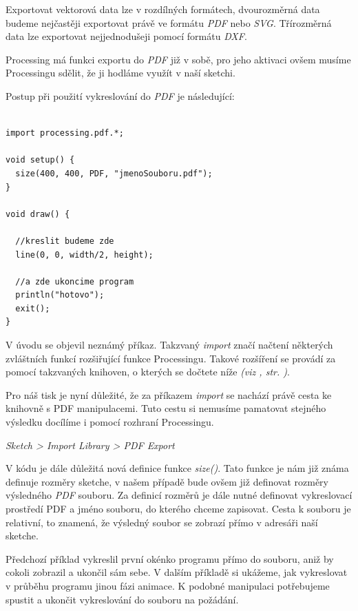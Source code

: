 \documentclass[10pt]{book}
\newcommand{\vyraz}[1]{\textit{\gls{#1}}\index{#1}\label{#1}}
\newcommand{\odkaz}[1]{\textit{(viz \nameref{#1}, str. \pageref*{#1})}}
\begin{document}
 Exportovat vektorová data lze v rozdílných formátech, dvourozměrná data budeme nejčastěji exportovat právě ve formátu {\em PDF} nebo {\em SVG}. Třírozměrná data lze exportovat nejjednodušeji pomocí formátu {\em DXF}.
 
    Processing má funkci exportu do {\em PDF} již v sobě, pro jeho aktivaci ovšem musíme Processingu sdělit, že ji hodláme využít v naší sketchi.
    
 Postup při použití vykreslování do {\em PDF} je následující:
 
\begin{lstlisting} 

import processing.pdf.*;

void setup() {
  size(400, 400, PDF, "jmenoSouboru.pdf");
}

void draw() {

  //kreslit budeme zde
  line(0, 0, width/2, height);

  //a zde ukoncime program
  println("hotovo");
  exit();
}

\end{lstlisting}

V úvodu se objevil neznámý příkaz. Takzvaný \vyraz{import} značí načtení některých zvláštních funkcí rozšiřující funkce Processingu. Takové rozšíření se provádí za pomocí takzvaných knihoven, o kterých se dočtete níže \odkaz{Knihovny}. 

Pro náš tisk je nyní důležité, že za příkazem \vyraz{import} se nachází právě cesta ke knihovně s PDF manipulacemi. Tuto cestu si nemusíme pamatovat stejného výsledku docílíme i pomocí rozhraní Processingu.

{\em Sketch > Import Library > PDF Export}

V kódu je dále důležitá nová definice funkce \vyraz{size()}. Tato funkce je nám již známa definuje rozměry sketche, v našem případě bude ovšem již definovat rozměry výsledného {\em PDF} souboru. Za definicí rozměrů je dále nutné definovat vykreslovací prostředí PDF a jméno souboru, do kterého chceme zapisovat. Cesta k souboru je relativní, to znamená, že výsledný soubor se zobrazí přímo v adresáři naší sketche.

 Předchozí příklad vykreslil první okénko programu přímo do souboru, aniž by cokoli zobrazil a ukončil sám sebe. V dalším příkladě si ukážeme, jak vykreslovat v průběhu programu jinou fázi animace. K podobné manipulaci potřebujeme spustit a ukončit vykreslování do souboru na požádání.
 
\end{document}
